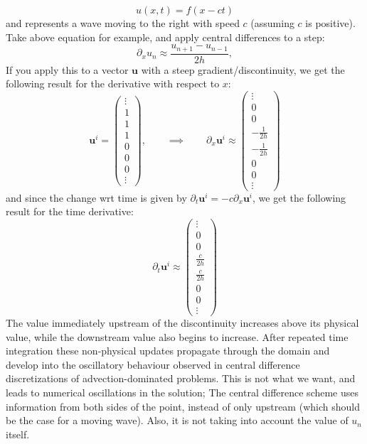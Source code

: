 \begin{equation*}
    u(x,t) = f(x - ct)
\end{equation*}
and represents a wave moving to the right with speed $c$ (assuming $c$ is positive). Take above equation for example, and apply central differences to a step:
\begin{equation*}
    \partial_x u_n \approx \frac{u_{n+1} - u_{n-1}}{2h},
\end{equation*}
If you apply this to a vector $\mathbf{u}$ with a steep gradient/discontinuity, we get the following result for the derivative with respect to $x$:
\begin{equation*}
    \mathbf{u}^i = \begin{pmatrix}
        \vdots \\ 1 \\ 1 \\ 1 \\ 0 \\ 0 \\ 0 \\ \vdots
    \end{pmatrix}, \qquad \implies \qquad
    \partial_x \mathbf{u}^i \approx \begin{pmatrix}
        \vdots \\ 0 \\ 0 \\ -\frac{1}{2h} \\ -\frac{1}{2h} \\ 0 \\ 0 \\ \vdots
    \end{pmatrix}
\end{equation*}
and since the change wrt time is given by $\partial_t \mathbf{u}^i = -c \partial_x \mathbf{u}^i$, we get the following result for the time derivative:
\begin{equation*}
    \partial_t \mathbf{u}^i \approx \begin{pmatrix}
        \vdots \\ 0 \\ 0 \\ \frac{c}{2h} \\ \frac{c}{2h} \\ 0 \\ 0 \\ \vdots
    \end{pmatrix}
\end{equation*}
The value immediately upstream of the discontinuity increases above its physical value, while the downstream value also begins to increase. After repeated time integration these non-physical updates propagate through the domain and develop into the oscillatory behaviour observed in central difference discretizations of advection-dominated problems. This is not what we want, and leads to numerical oscillations in the solution; The central difference scheme uses information from both sides of the point, instead of only upstream (which should be the case for a moving wave). Also, it is not taking into account the value of $u_n$ itself. 

